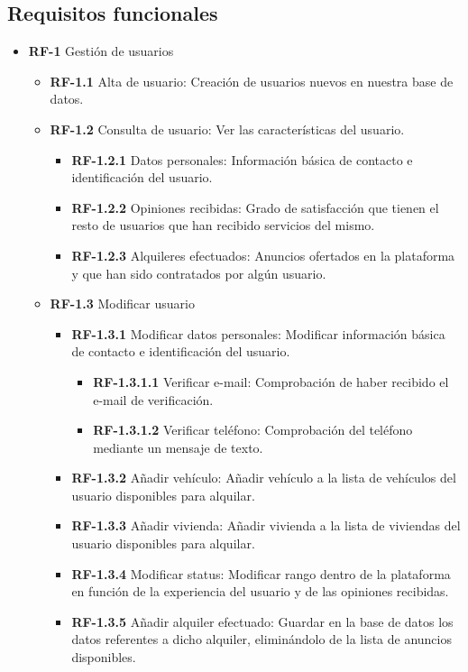 \documentclass[11pt,spanish]{article} %
\begin{document}
\subsection{Requisitos funcionales}
\begin{itemize}
	\item \textbf{RF-1} Gestión de usuarios
	\begin{itemize}
		\item \textbf{RF-1.1} Alta de usuario: Creación de usuarios nuevos en nuestra base de datos.

		\item \textbf{RF-1.2} Consulta de usuario: Ver las características del usuario.
		\begin{itemize}
			\item \textbf{RF-1.2.1} Datos personales: Información básica de contacto e identificación del usuario.
			\item \textbf{RF-1.2.2} Opiniones recibidas: Grado de satisfacción que tienen el resto de usuarios que han recibido servicios del mismo.
			\item \textbf{RF-1.2.3} Alquileres efectuados: Anuncios ofertados en la plataforma y que han sido contratados por algún usuario.
		\end{itemize}
		\item \textbf{RF-1.3} Modificar usuario
		\begin{itemize}
			\item \textbf{RF-1.3.1} Modificar datos personales: Modificar información básica de contacto e identificación del usuario.
			\begin{itemize}
				\item \textbf{RF-1.3.1.1} Verificar e-mail: Comprobación de haber recibido el e-mail de verificación.
				\item \textbf{RF-1.3.1.2} Verificar teléfono: Comprobación del teléfono mediante un mensaje de texto.
			\end{itemize}
			\item \textbf{RF-1.3.2} Añadir vehículo: Añadir vehículo a la lista de vehículos del usuario disponibles para alquilar.
			\item \textbf{RF-1.3.3} Añadir vivienda: Añadir vivienda a la lista de viviendas del usuario disponibles para alquilar.
			\item \textbf{RF-1.3.4} Modificar status: Modificar rango dentro de la plataforma en función de la experiencia del usuario y de las opiniones recibidas.
			\item \textbf{RF-1.3.5} Añadir alquiler efectuado: Guardar en la base de datos los datos referentes a dicho alquiler, eliminándolo de la lista de anuncios disponibles.

\end{itemize}
\end{itemize}
\end{itemize}
\end{document}
